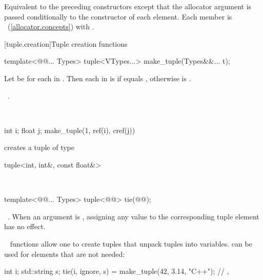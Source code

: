 \documentclass[american,twoside]{book}
\begin{document}
\begin{itemdescr}
\pnum
{}

\pnum
\mbox{\effects} Equivalent to the preceding constructors except that the allocator argument is passed conditionally to the constructor of each element. Each member is \mbox{}~(\mbox{\ref{allocator.concepts}}) with \mbox{}.
\end{itemdescr}

[tuple.creation]{Tuple creation functions}

%
%
\begin{itemdecl}
template<@@... Types>
  tuple<VTypes...> make_tuple(Types&&... t); 
\end{itemdecl}

\begin{itemdescr}
\pnum 
Let \mbox{} be \mbox{} for each \mbox{} in \mbox{}. Then each \mbox{} in \mbox{} is \mbox{} if \mbox{} equals \mbox{}, otherwise \mbox{} is \mbox{}.

\pnum
\returns\ .
 
\pnum
\enterexample\

\begin{codeblock}
int i; float j; 
make_tuple(1, ref(i), cref(j))
\end{codeblock}

creates a tuple of type 

\begin{codeblock}
tuple<int, int&, const float&>
\end{codeblock}

\exitexample\

\end{itemdescr}

%
%
\begin{itemdecl}
template<@@... Types>
  tuple<@@> tie(@@);
\end{itemdecl}

\begin{itemdescr}
\pnum
\returns\  .  When an
argument  is , assigning
any value to the corresponding tuple element has no effect.
 
\pnum
\enterexample\
 functions allow one to create tuples that unpack 
tuples into variables.  can be used for elements that
are not needed:
\begin{codeblock}
int i; std::string s;
tie(i, ignore, s) = make_tuple(42, 3.14, "C++");
// , 
\end{codeblock}
\exitexample\
\end{itemdescr}
\end{document}
